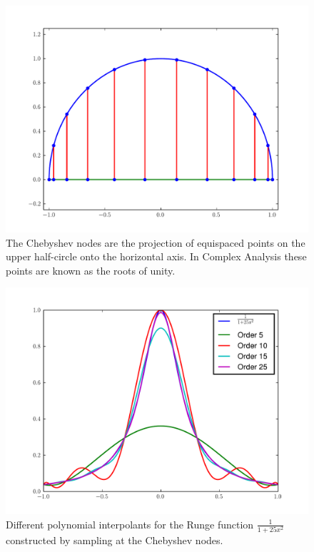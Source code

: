 \begin{figure}
\includegraphics[width=\textwidth]{node_project.pdf}
\caption{The Chebyshev nodes are the projection of equispaced points on the upper half-circle onto the horizontal axis.
In Complex Analysis these points are known as the roots of unity.}
\label{fig:cheb_nodes_projection}
\end{figure}

\begin{figure}
\includegraphics[width=\textwidth]{runge_chebyshev.pdf}
\caption{Different polynomial interpolants for the Runge function $\frac{1}{1 + 25 x^2}$ constructed by sampling at the Chebyshev nodes.}
\label{fig:runge_chebyshev}
\end{figure}

